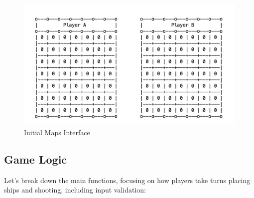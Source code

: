 \begin{enumerate}
    \begin{figure}[H]
        \centering
        \includegraphics[width=15cm]{graphics/maps.jpg}
        \caption{Initial Maps Interface}
    \end{figure}
    
\end{enumerate}

\newpage

\subsection{Game Logic}
\qquad Let's break down the main functions, focusing on how players take turns placing ships and shooting, including input validation:

